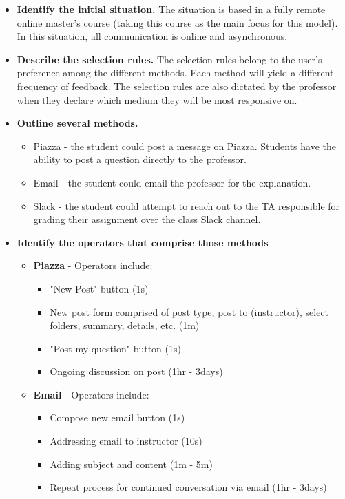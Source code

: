 \begin{itemize}
\item
  \textbf{Identify the initial situation.} The situation is based in a fully remote online master's course (taking this course as the main focus for this model). In this situation, all communication is online and asynchronous.
\item
  \textbf{Describe the selection rules.} The selection rules belong to the user's preference among the different methods. Each method will yield a different frequency of feedback. The selection rules are also dictated by the professor when they declare which medium they will be most responsive on.
\item
  \textbf{Outline several methods.}
  \begin{itemize}
  \item
    Piazza - the student could post a message on Piazza. Students have the ability to post a question directly to the professor.
  \item
    Email - the student could email the professor for the explanation.
  \item
    Slack - the student could attempt to reach out to the TA responsible for grading their assignment over the class Slack channel.
  \end{itemize}
\item
  \textbf{Identify the operators that comprise those methods}
  \begin{itemize}
  \item
    \textbf{Piazza} - Operators include:
    \begin{itemize}
    \item
      "New Post" button (1s)
    \item
      New post form comprised of post type, post to (instructor), select folders, summary, details, etc.  (1m)
    \item
      "Post my question" button (1s)
    \item
      Ongoing discussion on post (1hr - 3days)
    \end{itemize}
  \item
    \textbf{Email} - Operators include:
    \begin{itemize}
    \item
      Compose new email button (1s)
    \item
      Addressing email to instructor (10s)
    \item
      Adding subject and content (1m - 5m)
    \item
      Repeat process for continued conversation via email (1hr - 3days)


\end{itemize}
\end{itemize}
\end{itemize}
